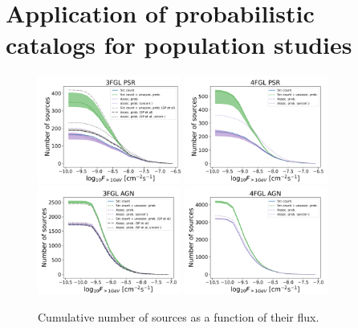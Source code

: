 \section{Application of probabilistic catalogs for population studies}



\begin{figure}[h]
\center
\includegraphics[width=0.42\textwidth]{plots/N_logS_3FGL_PSR_SazP.pdf}
\includegraphics[width=0.42\textwidth]{plots/N_logS_4FGL_PSR.pdf} \\
\includegraphics[width=0.42\textwidth]{plots/N_logS_3FGL_AGN_SazP.pdf}
\includegraphics[width=0.42\textwidth]{plots/N_logS_4FGL_AGN.pdf}
\caption{Cumulative number of sources as a function of their flux.}  
\label{fig:logN_logS}
\end{figure}


